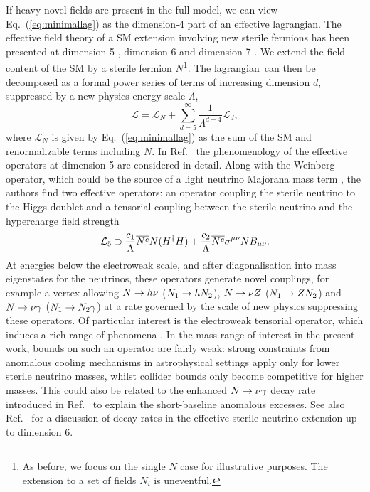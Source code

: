 \documentclass[11pt, a4paper]{article}
\newcommand{\refeq}[1]{Eq.~(\ref{#1})}
\newcommand{\refref}[1]{Ref.~\cite{#1}}
\def\lagrangian{lagrangian}
\def\ster{\ensuremath N}
\begin{document}
If heavy novel fields are present in the full model, we can view
\refeq{eq:minimallag} as the dimension-4 part of an effective lagrangian. The
effective field theory of a SM extension involving new sterile fermions has
been presented at dimension 5 \cite{delAguila:2008ir,Aparici:2009fh}, dimension
6 \cite{delAguila:2008ir} and dimension 7 \cite{Bhattacharya:2015vja}.
%
We extend the field content of the SM by a sterile fermion $N$\footnote{As
before, we focus on the single $N$ case for illustrative purposes. The
extension to a set of fields $N_i$ is uneventful.}.  The \lagrangian\ can then
be decomposed as a formal power series of terms of increasing dimension $d$,
suppressed by a new physics energy scale $\Lambda$,
%
\[  \mathcal{L} = \mathcal{L}_N + \sum_{d=5}^\infty
\frac{1}{\Lambda^{d-4}}\mathcal{L}_d, \]
%
where $\mathcal{L}_N$ is given by \refeq{eq:minimallag} as the sum of the SM
and renormalizable terms including $N$. In \refref{Aparici:2009fh} the
phenomenology of the effective operators at dimension 5 are considered in
detail. Along with the Weinberg operator, which could be the source of a light
neutrino Majorana mass term \cite{Weinberg:1979sa}, the authors find two
effective operators: an operator coupling the sterile neutrino to the Higgs
doublet and a tensorial coupling between the sterile neutrino and the
hypercharge field strength 
%
\[ \mathcal{L}_5 \supset \frac{c_1}{\Lambda}\overline{\ster^c}\ster(H^\dagger
H) + \frac{c_2}{\Lambda}\overline{\ster^c}\sigma^{\mu\nu}\ster B_{\mu\nu}. \] 
%
At energies below the electroweak scale, and after diagonalisation into mass
eigenstates for the neutrinos, these operators generate novel couplings, for
example a vertex allowing $\ster\to h \nu$ ($\ster_1\to h \ster_2$), $\ster\to
\nu Z$ ($\ster_1\to Z \ster_2$) and $\ster \to \nu \gamma$ ($\ster_1 \to
\ster_2 \gamma$) at a rate governed by the scale of new physics suppressing
these operators.
%
Of particular interest is the electroweak tensorial operator, which induces a
rich range of phenomena \cite{Aparici:2009fh}. In the mass range of interest in
the present work, bounds on such an operator are fairly weak: strong
constraints from anomalous cooling mechanisms in astrophysical settings apply
only for lower sterile neutrino masses, whilst collider bounds only become
competitive for higher masses. This could also be related to the enhanced
$\ster \to \nu\gamma$ decay rate introduced in
\refref{Gninenko:2009ks,Gninenko:2010pr} to explain the short-baseline
anomalous excesses.
%
See also \refref{Duarte:2016miz} for a discussion of decay rates in the
effective sterile neutrino extension up to dimension 6.
\end{document}
